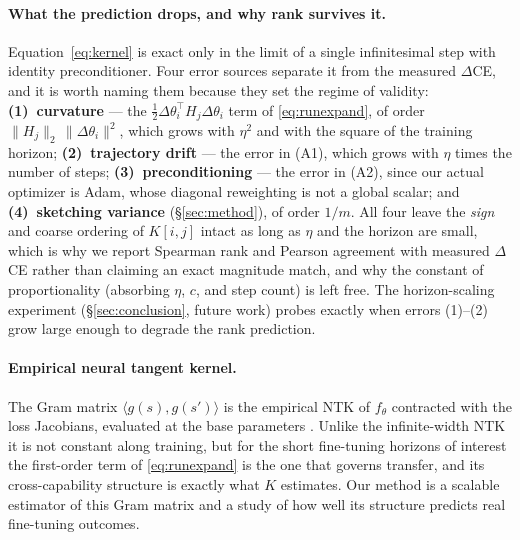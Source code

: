 \documentclass{article} %
\begin{document}
\paragraph{What the prediction drops, and why rank survives it.}
Equation~\eqref{eq:kernel} is exact only in the limit of a single infinitesimal step with
identity preconditioner. Four error sources separate it from the measured $\Delta$CE, and it is
worth naming them because they set the regime of validity: \textbf{(1)~curvature} --- the
$\tfrac12\Delta\theta_i^\top H_j\Delta\theta_i$ term of \eqref{eq:runexpand}, of order
$\|H_j\|_2\,\|\Delta\theta_i\|^2$, which grows with $\eta^2$ and with the square of the training
horizon; \textbf{(2)~trajectory drift} --- the error in (A1), which grows with $\eta$ times the
number of steps; \textbf{(3)~preconditioning} --- the error in (A2), since our actual optimizer is
Adam, whose diagonal reweighting is not a global scalar; and \textbf{(4)~sketching variance}
(\S\ref{sec:method}), of order $1/m$. All four leave the \emph{sign} and coarse ordering of
$K[i,j]$ intact as long as $\eta$ and the horizon are small, which is why we report Spearman rank
and Pearson agreement with measured $\Delta$CE rather than claiming an exact magnitude match, and
why the constant of proportionality (absorbing $\eta$, $c$, and step count) is left free. The
horizon-scaling experiment (\S\ref{sec:conclusion}, future work) probes exactly when errors
(1)--(2) grow large enough to degrade the rank prediction.

\paragraph{Empirical neural tangent kernel.}
The Gram matrix $\langle g(s), g(s')\rangle$ is the empirical NTK of $f_\theta$ contracted with
the loss Jacobians, evaluated at the base parameters \citep{jacot2018ntk,malladi2023kernel}.
Unlike the infinite-width NTK it is not constant along training, but for the short fine-tuning
horizons of interest the first-order term of \eqref{eq:runexpand} is the one that governs
transfer, and its cross-capability structure is exactly what $K$ estimates. Our method is a
scalable estimator of this Gram matrix and a study of how well its structure predicts real
fine-tuning outcomes.
\end{document}
